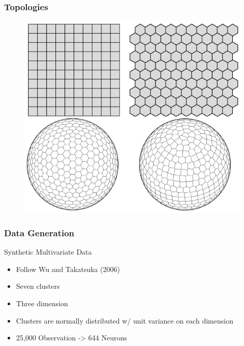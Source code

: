 \documentclass[nototal,handout]{beamer}
\begin{document}
\begin{frame}
	\frametitle{Topologies}
  \begin{center}
  \begin{figure}
  \includegraphics[width=0.75\linewidth]{topos.png}
  \end{figure}
  \end{center}
 \end{frame} 

\begin{frame}
	\frametitle{Data Generation}
 
\begin{block}{Synthetic Multivariate Data}
 \begin{itemize}
 \item  Follow Wu and Takatsuka (2006)
 \item  Seven clusters
 \item  Three dimension
 \item  Clusters are normally distributed w/ unit variance on each dimension
 \item  25,000 Observation -> 644 Neurons
 \end{itemize}
 \end{block} \end{frame} 
\end{document}
